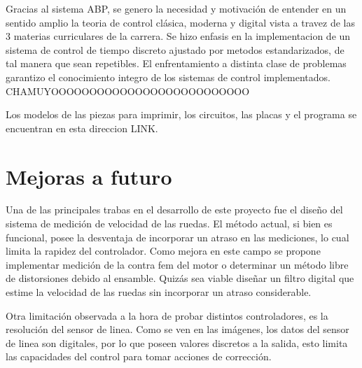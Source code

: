\documentclass[10pt,conference,a4paper,onecolumn]{article}%
\begin{document}
Gracias al sistema ABP, se genero la necesidad y motivación de entender en un sentido amplio  la teoria de control clásica, moderna y digital vista a travez de las 3 materias curriculares de la carrera. Se hizo enfasis en la implementacion de un sistema de control de tiempo discreto ajustado por metodos estandarizados, de tal manera que sean repetibles. El enfrentamiento a distinta clase de problemas garantizo el conocimiento integro de los sistemas de control implementados. CHAMUYOOOOOOOOOOOOOOOOOOOOOOOOOO 
 
Los modelos de las piezas para imprimir, los circuitos, las placas y el programa se encuentran en esta direccion LINK.

  


\section{Mejoras a futuro}
Una de las principales trabas en el desarrollo de este proyecto fue el diseño del sistema de medición de velocidad de las ruedas. El método actual, si bien es funcional, posee la desventaja de incorporar un atraso en las mediciones, lo cual limita la rapidez del controlador. Como mejora en este campo se propone implementar medición de la contra fem del motor o determinar un método libre de distorsiones debido al ensamble. Quizás sea viable diseñar un filtro digital que estime la velocidad de las ruedas sin incorporar un atraso considerable. 

Otra limitación observada a la hora de probar distintos controladores, es la resolución del sensor de linea. Como se ven en las imágenes, los datos del sensor de linea son digitales, por lo que poseen valores discretos a la salida, esto limita las capacidades del control para tomar acciones de corrección.
\end{document}
